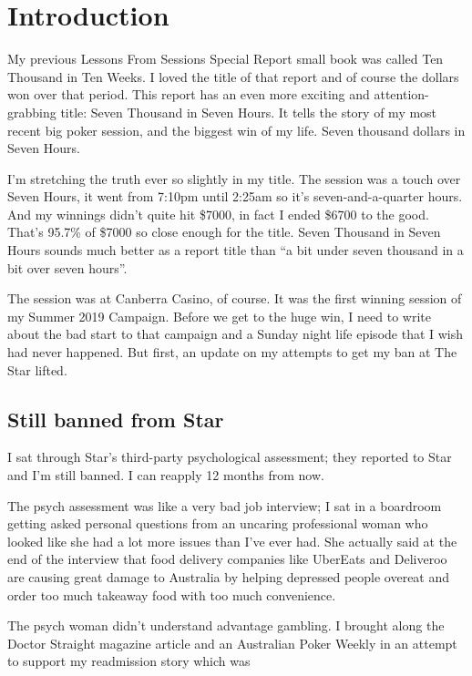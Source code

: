 \chapter{Introduction}


My previous Lessons From Sessions Special Report small book was
called Ten Thousand in Ten Weeks. I loved the title of that
report and of course the dollars won over that period.
This report has an even more exciting and attention-grabbing title: Seven
Thousand in Seven Hours. It tells the story of my most recent big
poker session, and the biggest win of my life. Seven thousand dollars
in Seven Hours.

I'm stretching the truth ever so slightly in my title. The session was
a touch over Seven Hours, it went from 7:10pm until 2:25am so it's
seven-and-a-quarter hours. And my winnings didn't quite hit \$7000, in
fact I ended \$6700 to the good. That's 95.7\% of \$7000 so close enough
for the title. Seven Thousand in Seven Hours sounds much better as a
report title than ``a bit under seven thousand in a bit over seven
hours''.

The session was at Canberra Casino, of course. It was the first winning
session of my Summer 2019 Campaign. Before we get to the huge win, I
need to write about the bad start to that campaign and a Sunday night
life episode that I wish had never happened. But first, an update on
my attempts to get my ban at The Star lifted.

\section*{Still banned from Star}

I sat through Star's third-party psychological assessment; they
reported to Star and I'm still banned. I can reapply 12 months from
now.

The psych assessment was like a very bad job interview; I sat in a
boardroom getting asked personal questions from an uncaring
professional woman who looked like she had a lot more issues than I've
ever had. She actually said at the end of the interview that food
delivery companies like UberEats and Deliveroo are causing great
damage to Australia by helping depressed people overeat and order too
much takeaway food with too much convenience.

The psych woman didn't understand advantage gambling. I brought along
the Doctor Straight magazine article and an Australian Poker Weekly in
an attempt to support my readmission story which was


